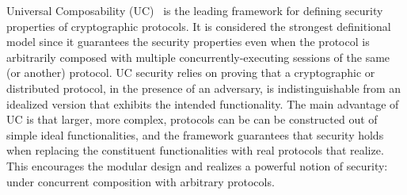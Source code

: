 Universal Composability (UC)~\cite{canettiUC} is the leading framework for defining security properties of cryptographic protocols.
It is considered the strongest definitional model since it guarantees the security properties even when the protocol is arbitrarily composed with
multiple concurrently-executing sessions of the same (or another) protocol.
UC security relies on proving that a cryptographic or distributed protocol, in the presence of an adversary, is indistinguishable from an idealized version that exhibits the intended functionality.
The main advantage of UC is that larger, more complex, protocols can be can be constructed out of simple ideal functionalities, and the framework guarantees that security holds when 
replacing the constituent functionalities with real protocols that realize.
This encourages the modular design and realizes a powerful notion of security: under concurrent composition with arbitrary protocols.




